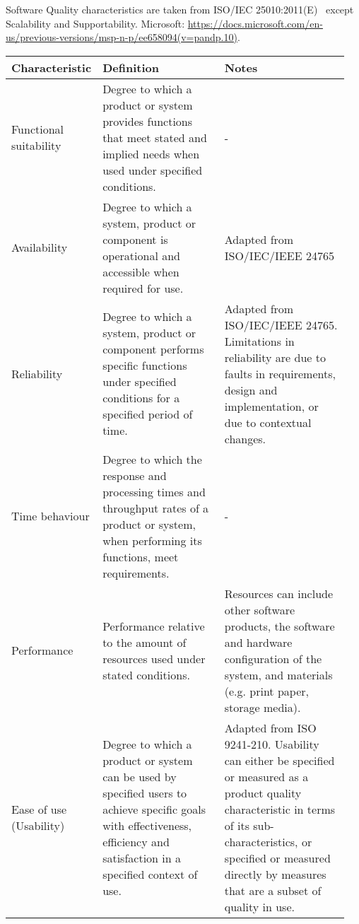 \begin{center}
\tablefirsthead{}
\tablehead{}
\tabletail{}
\tablelasttail{}
\caption{Software Quality characteristics are taken from ISO/IEC 25010:2011(E)~\cite{1400-1700_isoiec_nodate} except Scalability and Supportability. Microsoft: \url{https://docs.microsoft.com/en-us/previous-versions/msp-n-p/ee658094(v=pandp.10)}.}
\label{tab:table1}
\tiny
\begin{supertabular}{|p{0.15\linewidth}|p{0.4\linewidth}|p{0.4\linewidth}|}
\hline
\textbf{Characteristic} & \textbf{Definition} & \textbf{Notes} \\
\hline

Functional suitability &
Degree to which a product or system provides functions that meet stated and implied needs when used under specified conditions. &
-
\\ \hline

Availability &
Degree to which a system, product or component is operational and accessible when required for use. &
Adapted from ISO/IEC/IEEE 24765
\\ \hline

Reliability &
Degree to which a system, product or component performs specific functions under specified conditions for a specified period of time. &
Adapted from ISO/IEC/IEEE 24765. Limitations in reliability are due to faults in requirements, design and implementation, or due to contextual changes.
\\ \hline

Time behaviour &
Degree to which the response and processing times and throughput rates of a product or system, when performing its functions, meet requirements. &
-
\\ \hline

Performance &
Performance relative to the amount of resources used under stated conditions. &
Resources can include other software products, the software and hardware configuration of the system, and materials (e.g. print paper, storage media).
\\ \hline

Ease of use (Usability) &
Degree to which a product or system can be used by specified users to achieve specific goals with effectiveness, efficiency and satisfaction in a specified context of use. &
Adapted from ISO 9241-210. Usability can either be specified or measured as a product quality characteristic in terms of its sub-characteristics, or specified or measured directly by measures that are a subset of quality in use.
\\ \hline


\end{supertabular}
\end{center}
